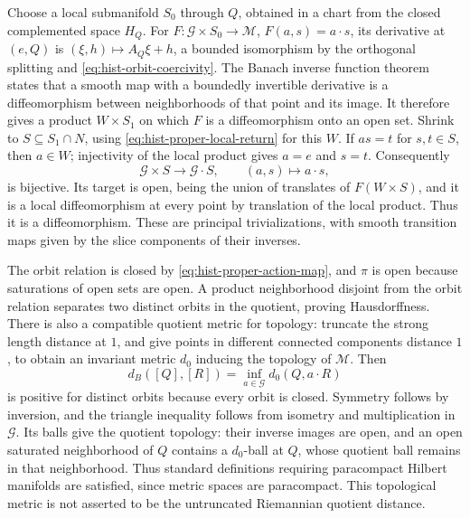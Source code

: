 Choose a local submanifold \(S_0\) through \(Q\), obtained in a chart from
the closed complemented space \(H_Q\). For
\(F:\mathcal G\times S_0\to\mathcal M\), \(F(a,s)=a\cdot s\),
its derivative at \((e,Q)\) is
\((\xi,h)\mapsto A_Q\xi+h\), a bounded isomorphism by the orthogonal
splitting and \eqref{eq:hist-orbit-coercivity}. The Banach inverse function
theorem states that a smooth map with a boundedly invertible derivative is
a diffeomorphism between neighborhoods of that point and its image.
It therefore gives a product \(W\times S_1\) on which \(F\) is a
diffeomorphism onto an open set. Shrink to
\(S\subseteq S_1\cap N\), using \eqref{eq:hist-proper-local-return}
for this \(W\). If \(as=t\) for \(s,t\in S\), then \(a\in W\);
injectivity of the local product gives \(a=e\) and \(s=t\).
Consequently
\begin{equation}
\mathcal G\times S\longrightarrow\mathcal G\cdot S,
\qquad
(a,s)\longmapsto a\cdot s,
\label{eq:hist-principal-slice}
\end{equation}
is bijective. Its target is open, being the union of translates of
\(F(W\times S)\), and it is a local diffeomorphism at every point by
translation of the local product. Thus it is a diffeomorphism.
These are principal trivializations, with smooth transition maps given
by the slice components of their inverses.

The orbit relation is closed by \eqref{eq:hist-proper-action-map}, and
\(\pi\) is open because saturations of open sets are open. A product
neighborhood disjoint from the orbit relation separates two distinct
orbits in the quotient, proving Hausdorffness. There is also a compatible
quotient metric for topology: truncate the strong length distance at
\(1\), and give points in different connected components distance \(1\),
to obtain an invariant metric \(d_0\) inducing the topology of
\(\mathcal M\). Then
\begin{equation}
d_B([Q],[R])=\inf_{a\in\mathcal G}d_0(Q,a\cdot R)
\label{eq:hist-quotient-topology-metric}
\end{equation}
is positive for distinct orbits because every orbit is closed.
Symmetry follows by inversion, and the triangle inequality follows from
isometry and multiplication in \(\mathcal G\). Its balls give the quotient
topology: their inverse images are open, and an open saturated neighborhood
of \(Q\) contains a \(d_0\)-ball at \(Q\), whose quotient ball remains in
that neighborhood. Thus standard definitions requiring paracompact
Hilbert manifolds are satisfied, since metric spaces are paracompact.
This topological metric is not asserted to be the untruncated Riemannian
quotient distance.


